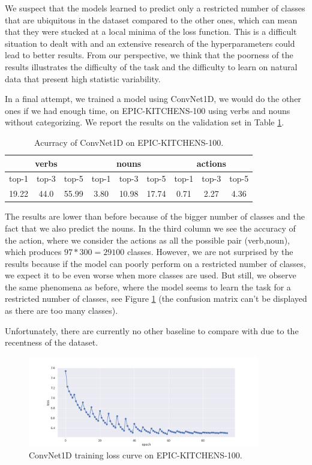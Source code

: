 \documentclass[12pt, a4paper]{report}
\begin{document}
			We suspect that the models learned to predict only a restricted number of classes that are ubiquitous in the dataset compared to the other ones, which can mean that they were stucked at a local minima of the loss function.
			This is a difficult situation to dealt with and an extensive research of the hyperparameters could lead to better results.
			From our perspective, we think that the poorness of the results illustrates the difficulty of the task and the difficulty to learn on natural data that present high statistic variability.
			\par
			In a final attempt, we trained a model using ConvNet1D, we would do the other ones if we had enough time, on EPIC-KITCHENS-100 using verbs and nouns without categorizing.
			We report the results on the validation set in Table \ref{convnet_accuracy}.
			\begin{table}[h!]
				\centering
				\begin{tabular}{| c | c | c | c | c | c | c | c | c |}
					\hline
					\multicolumn{3}{|c|}{verbs} & \multicolumn{3}{|c|}{nouns} & \multicolumn{3}{|c|}{actions} \\
					\hline
					top-1 & top-3 & top-5 & top-1 & top-3 & top-5 & top-1 & top-3 & top-5 \\
					\hline
					19.22 & 44.0 & 55.99 & 3.80 & 10.98 & 17.74 & 0.71 & 2.27 & 4.36 \\
					\hline
				\end{tabular}
				\caption{Acurracy of ConvNet1D on EPIC-KITCHENS-100.}
				\label{convnet_accuracy}
			\end{table}
			The results are lower than before because of the bigger number of classes and the fact that we also predict the nouns.
			In the third column we see the accuracy of the action, where we consider the actions as all the possible pair (verb,noun), which produces $97*300=29100$ classes.
			However, we are not surprised by the results because if the model can poorly perform on a restricted number of classes, we expect it to be even worse when more classes are used.
			But still, we observe the same phenomena as before, where the model seems to learn the task for a restricted number of classes, see Figure \ref{convnet_curve} (the confusion matrix can't be displayed as there are too many classes).
			\par
			Unfortunately, there are currently no other baseline to compare with due to the recentness of the dataset.
			\begin{figure}[h!]
				\centering
				\includegraphics[width=0.9\textwidth]{convnet1Df_curve.png}
				\caption{ConvNet1D training loss curve on EPIC-KITCHENS-100.}
				\label{convnet_curve}
			\end{figure}
\end{document}
